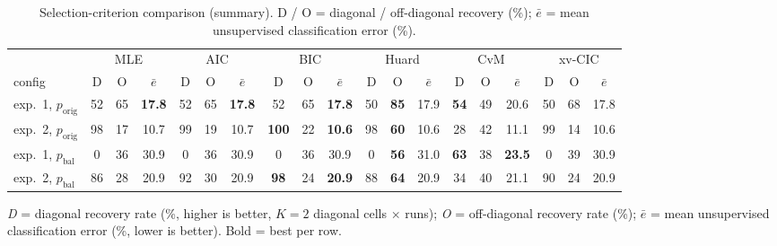 \begin{table}[htbp]
  \centering
  \caption{Selection-criterion comparison (summary). D / O = diagonal / off-diagonal recovery (\%); $\bar{e}$ = mean unsupervised classification error (\%).}
  \label{tab:exp4-summary}
  \footnotesize
  \begin{tabular}{l ccc ccc ccc ccc ccc ccc }
    \toprule
    & \multicolumn{3}{c}{MLE} & \multicolumn{3}{c}{AIC} & \multicolumn{3}{c}{BIC} & \multicolumn{3}{c}{Huard} & \multicolumn{3}{c}{CvM} & \multicolumn{3}{c}{xv-CIC} \\
    \cmidrule(lr){2-4}\cmidrule(lr){5-7}\cmidrule(lr){8-10}\cmidrule(lr){11-13}\cmidrule(lr){14-16}\cmidrule(lr){17-19}
    config  & D & O & $\bar{e}$ & D & O & $\bar{e}$ & D & O & $\bar{e}$ & D & O & $\bar{e}$ & D & O & $\bar{e}$ & D & O & $\bar{e}$ \\
    \midrule
    exp.\ 1, $p_{\text{orig}}$ & 52 & 65 & \textbf{17.8} & 52 & 65 & \textbf{17.8} & 52 & 65 & \textbf{17.8} & 50 & \textbf{85} & 17.9 & \textbf{54} & 49 & 20.6 & 50 & 68 & 17.8 \\
    exp.\ 2, $p_{\text{orig}}$ & 98 & 17 & 10.7 & 99 & 19 & 10.7 & \textbf{100} & 22 & \textbf{10.6} & 98 & \textbf{60} & 10.6 & 28 & 42 & 11.1 & 99 & 14 & 10.6 \\
    exp.\ 1, $p_{\text{bal}}$ & 0 & 36 & 30.9 & 0 & 36 & 30.9 & 0 & 36 & 30.9 & 0 & \textbf{56} & 31.0 & \textbf{63} & 38 & \textbf{23.5} & 0 & 39 & 30.9 \\
    exp.\ 2, $p_{\text{bal}}$ & 86 & 28 & 20.9 & 92 & 30 & 20.9 & \textbf{98} & 24 & \textbf{20.9} & 88 & \textbf{64} & 20.9 & 34 & 40 & 21.1 & 90 & 24 & 20.9 \\
    \bottomrule
  \end{tabular}
  \par\smallskip
  \emph{D} = diagonal recovery rate (\%, higher is better, $K{=}2$ diagonal cells $\times$ runs); \emph{O} = off-diagonal recovery rate (\%); $\bar{e}$ = mean unsupervised classification error (\%, lower is better). Bold = best per row.
\end{table}

